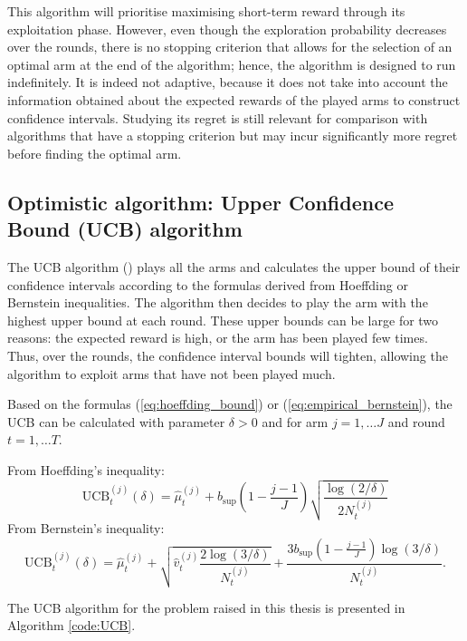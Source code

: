 \documentclass{statsmsc}
\begin{document}
This algorithm will prioritise maximising short-term reward through its exploitation phase. However, even though the exploration probability decreases over the rounds, there is no stopping criterion that allows for the selection of an optimal arm at the end of the algorithm; hence, the algorithm is designed to run indefinitely. 
It is indeed not adaptive, because it does not take into account the information obtained about the expected rewards of the played arms to construct confidence intervals.
Studying its regret is still relevant for comparison with algorithms 
that have a stopping criterion but may incur significantly more regret before finding the optimal arm.

\subsection{Optimistic algorithm: Upper Confidence Bound (UCB) algorithm}

The UCB algorithm (\cite{ucbcitation}) plays all the arms and calculates the upper bound of their confidence intervals according to the formulas derived from 
Hoeffding or Bernstein inequalities. The algorithm then decides to play the arm with the highest upper bound at each round. These upper bounds can be large for two reasons: the expected reward is high, or the arm has been played few times. 
Thus, over the rounds, the confidence interval bounds will tighten, allowing the algorithm to exploit arms that have not been played much.

Based on the formulas (\ref{eq:hoeffding_bound}) or (\ref{eq:empirical_bernstein}), the UCB can be calculated with parameter $\delta >0$ and for arm $j = 1, \dots J$ and round $t = 1, \dots T$.

From Hoeffding's inequality:
\begin{equation}
 \text{UCB}^{(j)}_t(\delta) = \hat{\mu}_t^{(j)} + b_{\sup}\left(1 - \frac{j-1}{J}\right)\sqrt{\frac{\log(2/\delta)}{2 N_t^{(j)}}}
 \label{eq:UCB_hoeffding}
\end{equation}
From Bernstein's inequality:
\begin{equation}
  \text{UCB}^{(j)}_t(\delta) = \hat{\mu}_t^{(j)} +\sqrt{\hat{v}_t^{(j)}\frac{2\log(3/\delta)}{N_t^{(j)}}} + \frac{3 b_{\sup}\left(1 - \frac{j-1}{J}\right) \log(3/\delta)}{N_t^{(j)}}.
\label{eq:UCB_bernstein}
\end{equation}

The UCB algorithm for the problem raised in this thesis is presented in Algorithm \ref{code:UCB}.
\end{document}
